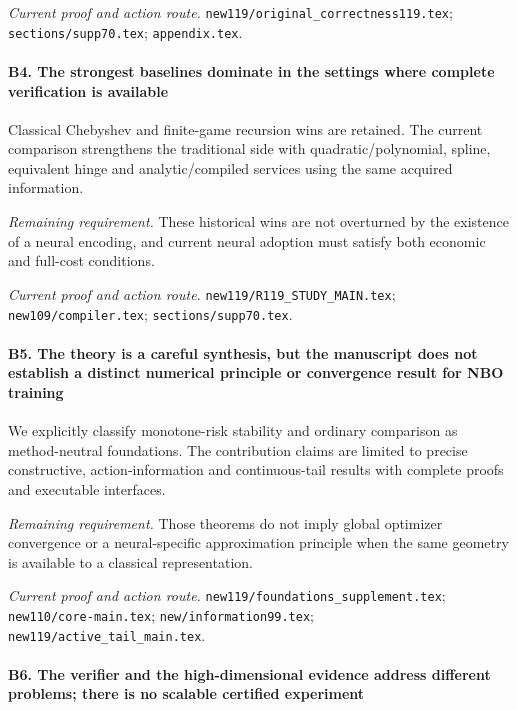 \par\emph{Current proof and action route.} \nolinkurl{new119/original_correctness119.tex}; \nolinkurl{sections/supp70.tex}; \nolinkurl{appendix.tex}.

\paragraph{B4. The strongest baselines dominate in the settings where complete verification is available}

Classical Chebyshev and finite-game recursion wins are retained. The current comparison strengthens the traditional side with quadratic/\allowbreak{}polynomial, spline, equivalent hinge and analytic/\allowbreak{}compiled services using the same acquired information.

\par\emph{Remaining requirement.} These historical wins are not overturned by the existence of a neural encoding, and current neural adoption must satisfy both economic and full-cost conditions.

\par\emph{Current proof and action route.} \nolinkurl{new119/R119_STUDY_MAIN.tex}; \nolinkurl{new109/compiler.tex}; \nolinkurl{sections/supp70.tex}.

\paragraph{B5. The theory is a careful synthesis, but the manuscript does not establish a distinct numerical principle or convergence result for NBO training}

We explicitly classify monotone-risk stability and ordinary comparison as method-neutral foundations. The contribution claims are limited to precise constructive, action-information and continuous-tail results with complete proofs and executable interfaces.

\par\emph{Remaining requirement.} Those theorems do not imply global optimizer convergence or a neural-specific approximation principle when the same geometry is available to a classical representation.

\par\emph{Current proof and action route.} \nolinkurl{new119/foundations_supplement.tex}; \nolinkurl{new110/core-main.tex}; \nolinkurl{new/information99.tex}; \nolinkurl{new119/active_tail_main.tex}.

\paragraph{B6. The verifier and the high-dimensional evidence address different problems; there is no scalable certified experiment}

